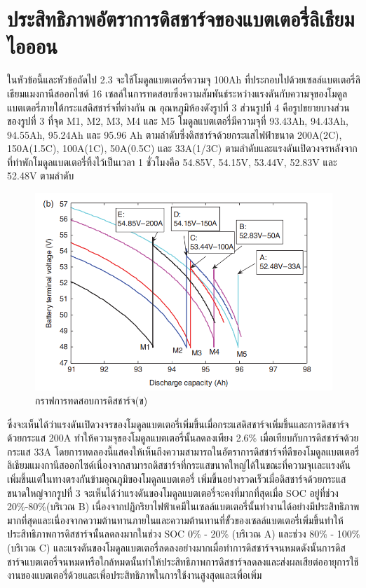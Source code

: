 \section{ประสิทธิภาพอัตราการดิสชาร์จของแบตเตอรี่ลิเธียมไอออน}
ในหัวข้อนี้และหัวข้อถัดไป 2.3 จะใช้โมดูลแบตเตอรี่ความจุ 100Ah ที่ประกอบไปด้วยเซลล์แบตเตอรี่ลิเธียมแมงกานีสออกไซด์ 16 เซลล์ในการทดสอบซึ่งความสัมพันธ์ระหว่างแรงดันกับความจุของโมดูลแบตเตอรี่ภายใต้กระแสดิสชาร์จที่ต่างกัน ณ อุณหภูมิห้องดังรูปที่ 3 ส่วนรูปที่ 4 คือรูปขยายบางส่วนของรูปที่ 3 ที่จุด M1, M2, M3, M4 และ M5 โมดูลแบตเตอรี่มีความจุที่ 93.43Ah, 94.43Ah, 94.55Ah, 95.24Ah และ 95.96 Ah ตามลำดับซึ่งดิสชาร์จด้วยกระแสไฟฟ้าขนาด 200A(2C), 150A(1.5C), 100A(1C), 50A(0.5C) และ 33A(1/3C) ตามลำดับและแรงดันเปิดวงจรหลังจากที่ทำพักโมดูลแบตเตอรี่ทิ้งไว้เป็นเวลา 1 ชั่วโมงคือ 54.85V, 54.15V, 53.44V, 52.83V และ 52.48V ตามลำดับ
\begin{center}
	\begin{figure}[H]
		\includegraphics[width=0.6\linewidth]{Chapters/img/IV_b.png}
			\centering
			\captionsetup{justification=centering,margin=2cm}
			\caption{กราฟการทดสอบการดิสชาร์จ(ข)}
	\end{figure}
\end{center}
ซึ่งจะเห็นได้ว่าแรงดันเปิดวงจรของโมดูลแบตเตอรี่เพิ่มขึ้นเมื่อกระแสดิสชาร์จเพิ่มขึ้นและการดิสชาร์จด้วยกระแส 200A ทำให้ความจุของโมดูลแบตเตอรี่นั้นลดลงเพียง 2.6\% เมื่อเทียบกับการดิสชาร์จด้วยกระแส 33A โดยการทดลองนี้แสดงให้เห็นถึงความสามารถในอัตราการดิสชาร์จที่ดีของโมดูลแบตเตอรี่ลิเธียมแมงกานีสออกไซด์เนื่องจากสามารถดิสชาร์จที่กระแสขนาดใหญ่ได้ในขณะที่ความจุเเละแรงดันเพิ่มขึ้นแต่ในทางตรงกันข้ามอุณภูมิของโมดูลแบตเตอรี่
เพิ่มขึ้นอย่างรวดเร็วเมื่อดิสชาร์จด้วยกระแสขนาดใหญ่จากรูปที่ 3 จะเห็นได้ว่าแรงดันของโมดูลแบตเตอรี่จะคงที่มากที่สุดเมื่อ SOC อยู่ที่ช่วง 20\%-80\%(บริเวณ B) เนื่องจากปฏิกริยาไฟฟ้าเคมีในเซลล์แบตเตอรี่นั้นทำงานได้อย่างมีประสิทธิภาพมากที่สุดและเนื่องจากความต้านทานภายในและความต้านทานที่ขั้วของเซลล์แบตเตอรี่เพิ่มขึ้นทำให้ประสิทธิภาพการดิสชาร์จนั้นลดลงมากในช่วง SOC 0\% - 20\%
(บริเวณ A) และช่วง 80\% - 100\%(บริเวณ C) และแรงดันของโมดูลแบตเตอรี่ลดลงอย่างมากเมื่อทำการดิสชาร์จจนหมดดังนั้นการดิสชาร์จแบตเตอรี่จนหมดหรือใกล้หมดนั้นทำให้ประสิทธิภาพการดิสชาร์จลดลงและส่งผลเสียต่ออายุการใช้งานของแบตเตอรี่ด้วยและเพื่อประสิทธิภาพในการใช้งานสูงสุดและเพื่อเพิ่ม
